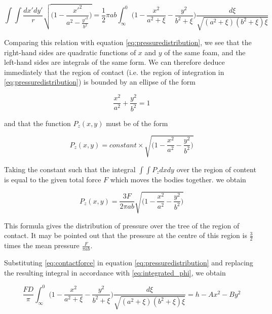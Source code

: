 \begin{equation}
\int\int\frac{dx'dy'}{r}\sqrt{\Big( 1- \frac{x'^{2}}{a^{2} - \frac{y'^{2}}{b^{2}}} \Big)} = \frac{1}{2}\pi ab\int_{\infty}^{0} \Big( 1-\frac{x^{2}}{a^{2}+\xi} - \frac{y^{2}}{b^{2}+\xi} \Big) \frac{d\xi}{\sqrt{(a^{2}+\xi)(b^{2}+\xi)\xi}}
\label{eq:integrated_phi}
\end{equation}

Comparing this relation with equation \ref{eq:pressuredistribution}, we see that the right-hand sides are quadratic functions of $x$ and $y$ of the same foam, and the left-hand sides are integrals of the same form. We can therefore deduce immediately that the region of contact (i.e. the region of integration in \ref{eq:pressuredistribution}) is bounded
by an ellipse of the form

\begin{equation}
\frac{x^{2}}{a^{2}} + \frac{y^{2}}{b^{2}} = 1
\label{eq:ellipse}
\end{equation}




and that the function $P_{z}(x,y)$ must be of the form

\begin{equation}
P_{z}(x,y) = constant \times \sqrt{\Big( 1 - \frac{x^{2}}{a^{2}} - \frac{y^{2}}{b^{2}} \Big)}
\end{equation}


Taking the constant such that the integral $\int\int P_{z}dxdy$ over the region of
content is equal to the given total force $F$ which moves the bodies together.
we obtain

\begin{equation}
P_{z}(x,y) = \frac{3F}{2\pi ab} \sqrt{\Big( 1 - \frac{x^{2}}{a^{2}} - \frac{y^{2}}{b^{2}} \Big)}
\label{eq:contactforce}
\end{equation}

This formula gives the distribution of pressure over the tree of the region of
contact. It may be pointed out that the pressure at the centre of this region
is $\frac{3}{2}$ times the mean pressure $\frac{F}{\pi ab}$.

Substituting \ref{eq:contactforce} in equation \ref{eq:pressuredistribution} and replacing the resulting integral
in accordance with \ref{eq:integrated_phi}, we obtain

\begin{equation}
\frac{FD}{\pi} \int_{\infty}^{0} \Big( 1 - \frac{x^{2}}{a^{2} + \xi} - \frac{y^{2}}{b^{2} + \xi} \Big) \frac{d\xi}{\sqrt{(a^{2} + \xi)(b^{2} + \xi)\xi}} = h - Ax^{2} - By^{2}
\label{eq:D}
\end{equation}

